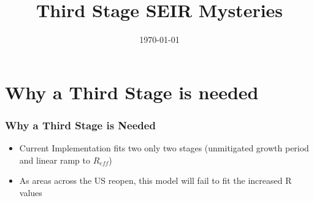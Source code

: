 \documentclass{beamer}
\title[Third Stage SEIR]{Third Stage SEIR Mysteries} %
\date{\today} %
\newcommand{\oldestadj}{data/api-results-493/pyseir/myplots/}
\newcommand{\oldadj}{data/api-results-486/pyseir/myplots/}
\newcommand{\latestadj}{data/api-results-489/pyseir/myplots/}
\newcommand\makeslide[1]{
\begin{frame}%

    \begin{columns}
    \column{0.05\textwidth}
    \tiny Adjusted R\\ 
    \vspace{3cm}
    \tiny Not-Adjusted R
     \column{0.33\textwidth}
       \texttt{[image: \\oldestadj mle\_fit\_results\_\_\#1.pdf]} \\  
        \texttt{[image: \\oldestadj mle\_fit\_results\_\_\#1.pdf]}   
       \captionof{figure}{June 10}   
        \column{0.33\textwidth}
       \texttt{[image: \\oldadj mle\_fit\_results\_\_\#1.pdf]}  \\ 
        \texttt{[image: \\oldadj mle\_fit\_results\_\_\#1.pdf]}  

       \captionof{figure}{June 11}   
        \column{0.33\textwidth} 
        \texttt{[image: \\latestadj mle\_fit\_results\_\_\#1.pdf]}  \\ 
        \texttt{[image: \\latestadj mle\_fit\_results\_\_\#1.pdf]}  

       \captionof{figure}{June 12}  
\end{columns}
\end{frame}
}
\begin{document}
\begin{frame}
\titlepage %
\end{frame}


\iffalse
\begin{frame}
\tableofcontents
\end{frame}
\fi

\iffalse
\section{Why a Third Stage is needed} %
\begin{frame}
\frametitle{Why a Third Stage is Needed}
\begin{itemize}[label={-}]
\item Current Implementation fits two only two stages (unmitigated growth period and linear ramp to $R_{eff}$)
\item As areas across the US reopen, this model will fail to fit the increased R values

\end{itemize}
\end{frame}
\end{document}
